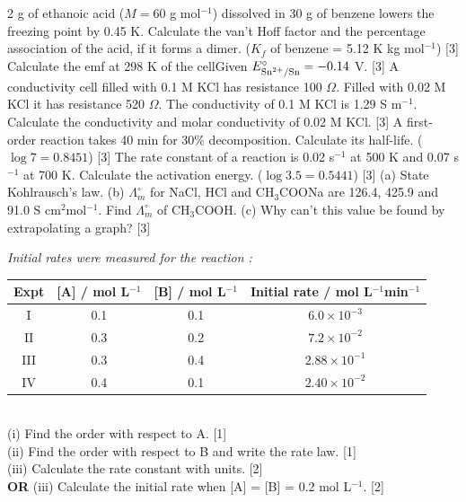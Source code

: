 \documentclass[10pt,a4paper]{extarticle}
\newcommand{\mk}[1]{{\scriptsize\color{black!55}[#1]}}
\begin{document}
\begin{multicols}{2}
 g of ethanoic acid ($M=60$ g mol$^{-1}$) dissolved in 30 g of benzene lowers the freezing point by 0.45 K. Calculate the van't Hoff factor and the percentage association of the acid, if it forms a dimer. ($K_f$ of benzene = 5.12 K kg mol$^{-1}$) \mk{3}
\Q Calculate the emf at 298 K of the cell\nl {}\nl Given $E^\circ_{\ce{Sn^2+/Sn}}=-0.14$ V. \mk{3}
\Q A conductivity cell filled with 0.1 M KCl has resistance 100 $\Omega$. Filled with 0.02 M KCl it has resistance 520 $\Omega$. The conductivity of 0.1 M KCl is 1.29 S m$^{-1}$. Calculate the conductivity and molar conductivity of 0.02 M KCl. \mk{3}
\Q A first-order reaction takes 40 min for 30\% decomposition. Calculate its half-life. ($\log7=0.8451$) \mk{3}
\Q The rate constant of a reaction is 0.02 s$^{-1}$ at 500 K and 0.07 s$^{-1}$ at 700 K. Calculate the activation energy. ($\log3.5=0.5441$) \mk{3}
\Q (a) State Kohlrausch's law. (b) $\Lambda^\circ_m$ for NaCl, HCl and CH$_3$COONa are 126.4, 425.9 and 91.0 S cm$^2$mol$^{-1}$. Find $\Lambda^\circ_m$ of CH$_3$COOH. (c) Why can't this value be found by extrapolating a graph? \mk{3}

\Q \textit{Initial rates were measured for the reaction :}\\[2pt]
{\scriptsize\begin{tabular}{@{}cccc@{}}\toprule Expt & [A] / mol L$^{-1}$ & [B] / mol L$^{-1}$ & Initial rate / mol L$^{-1}$min$^{-1}$\\\midrule
I & 0.1 & 0.1 & $6.0\times10^{-3}$\\ II & 0.3 & 0.2 & $7.2\times10^{-2}$\\ III & 0.3 & 0.4 & $2.88\times10^{-1}$\\ IV & 0.4 & 0.1 & $2.40\times10^{-2}$\\\bottomrule\end{tabular}}\\[2pt]
(i) Find the order with respect to A. \mk{1}\\
(ii) Find the order with respect to B and write the rate law. \mk{1}\\
(iii) Calculate the rate constant with units. \mk{2}\\
\textbf{OR} (iii) Calculate the initial rate when [A] = [B] = 0.2 mol L$^{-1}$. \mk{2}


\end{multicols}
\end{document}
